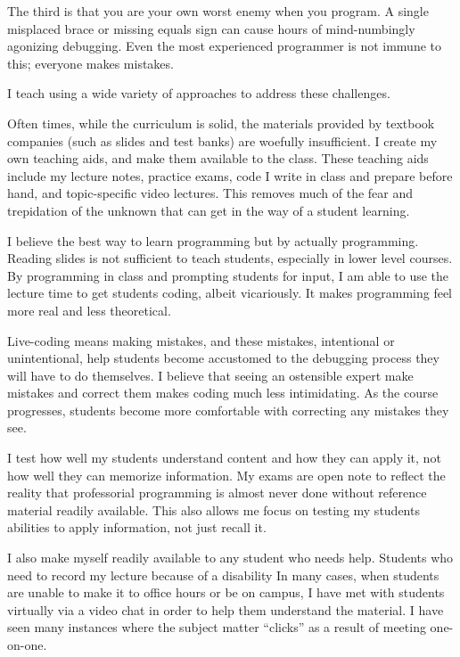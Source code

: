 \documentclass[10pt, a4paper]{article}
\begin{document}
The third is that you are your own worst enemy when you program.
A single misplaced brace or missing equals sign can cause hours of mind-numbingly agonizing debugging.
Even the most experienced programmer is not immune to this; everyone makes mistakes.

I teach using a wide variety of approaches to address these challenges.

Often times, while the curriculum is solid, the materials provided by textbook companies (such as slides and test banks) are woefully insufficient.
I create my own teaching aids, and make them available to the class.
These teaching aids include my lecture notes, practice exams, code I write in class and prepare before hand, and topic-specific video lectures.
This removes much of the fear and trepidation of the unknown that can get in the way of a student learning.

I believe the best way to learn programming but by actually programming.
Reading slides is not sufficient to teach students, especially in lower level courses.
By programming in class and prompting students for input, I am able to use the lecture time to get students coding, albeit vicariously.
It makes programming feel more real and less theoretical.

Live-coding means making mistakes, and these mistakes, intentional or unintentional, help students become accustomed to the debugging process they will have to do themselves.
I believe that seeing an ostensible expert make mistakes and correct them makes coding much less intimidating.
As the course progresses, students become more comfortable with correcting any mistakes they see.

I test how well my students understand content and how they can apply it, not how well they can memorize information.
My exams are open note to reflect the reality that professorial programming is almost never done without reference material readily available.
This also allows me focus on testing my students abilities to apply information, not just recall it.

I also make myself readily available to any student who needs help.
Students who need to record my lecture because of a disability
In many cases, when students are unable to make it to office hours or be on campus, I have met with students virtually via a video chat in order to help them understand the material.
I have seen many instances where the subject matter ``clicks'' as a result of meeting one-on-one.
\end{document}
